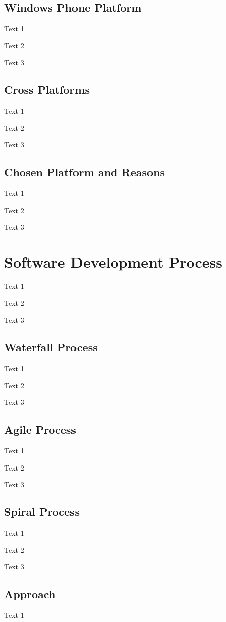 \subsection{Windows Phone Platform} \label{sec:b2.3}
Text 1

Text 2

Text 3

\subsection{Cross Platforms} \label{sec:b2.4}
Text 1

Text 2

Text 3

\subsection{Chosen Platform and Reasons} \label{sec:b2.5}
Text 1

Text 2

Text 3

\section{Software Development Process} \label{sec:b3}
Text 1

Text 2

Text 3

\subsection{Waterfall Process} \label{sec:b3.1}
Text 1

Text 2

Text 3

\subsection{Agile Process} \label{sec:b3.2}
Text 1

Text 2

Text 3

\subsection{Spiral Process} \label{sec:b3.3}
Text 1

Text 2

Text 3

\subsection{Approach} \label{sec:b3.4}
Text 1

